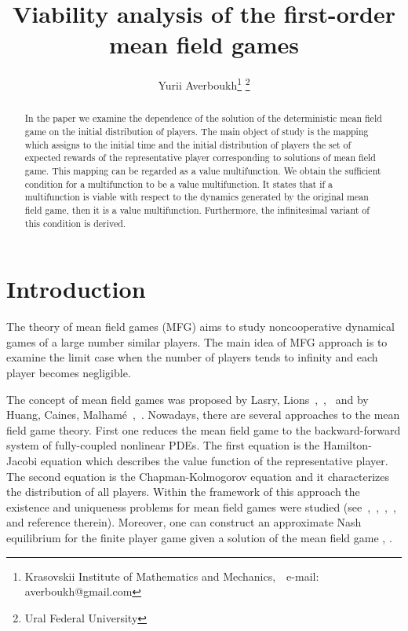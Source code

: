 \documentclass[a4paper,12pt]{article}
\title{Viability analysis of the first-order mean field games}
\author{Yurii Averboukh\footnote{Krasovskii Institute of Mathematics and Mechanics,\ \ e-mail: averboukh@gmail.com}{ }\footnote{Ural Federal University}}
\date{}
\begin{document}
\maketitle

\begin{abstract} In the paper we examine the dependence of the solution of the deterministic mean field game on the initial distribution of players. The main object of study is the mapping which assigns to  the initial time and the initial distribution of players the set  of expected rewards of the representative player corresponding to solutions of mean field game. This mapping can be regarded as a value multifunction. We obtain the sufficient condition for a  multifunction to be a value multifunction. It states that if a multifunction is viable with respect to the dynamics generated by the original mean field game, then it is a value multifunction. Furthermore, the infinitesimal variant of this condition is derived. 
\end{abstract}

\section*{Introduction}

The theory of mean field games (MFG) aims to study  noncooperative dynamical games of a large number similar players. The main idea of MFG approach is to  examine the limit case when the number of players tends to infinity and each player becomes negligible. 


The concept of mean field games was proposed by Lasry, Lions~\cite{Lasry_Lions_2006_I},~\cite{Lasry_Lions_2006_II},~\cite{Lasry_Lions_2007} and by Huang, Caines, Malham\'{e}~\cite{Huang_Caines_Malhame_2007},~\cite{Huang_Malhame_Caines_2006}. Nowadays, there are several approaches to the mean field game theory. First one reduces the mean field game to the backward-forward system of fully-coupled nonlinear PDEs. The first equation is the Hamilton-Jacobi equation which describes the value function of the representative player. The second equation is the Chapman-Kolmogorov equation and it characterizes the distribution of all players.   Within the framework of this approach the existence and uniqueness problems for mean field games were studied (see~\cite{Gomes_et_book_2017},~\cite{Kolokoltsov_Li_Yang_2011},~\cite{Lasry_Lions_2006_II},~\cite{Lasry_Lions_2007},   and reference therein). Moreover,  one can construct an approximate Nash equilibrium for the finite player game given a solution of the mean field game \cite{Kolokoltsov_Li_Yang_2011}, \cite{lions_lecture}.
\end{document}
